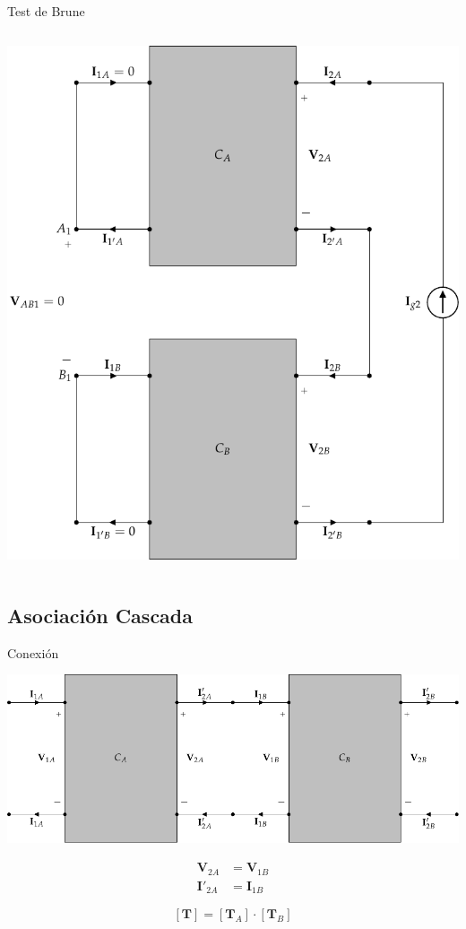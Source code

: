 \documentclass[aspectratio=169, usenames,svgnames,dvipsnames]{beamer}
\begin{document}
\begin{frame}[label={sec:org58fb5cc},plain]{Test de Brune}
\begin{columns}
\begin{column}{0.5\columnwidth}
\begin{center}
\includegraphics[height=0.8\textheight]{../figs/paralelo-serie-brune-salida.pdf}
\end{center}
\end{column}
\end{columns}
\end{frame}
\subsection{Asociación Cascada}
\label{sec:org3f9836b}

\begin{frame}[label={sec:org74dabef}]{Conexión}
\begin{center}
\includegraphics[height=0.5\textheight]{../figs/cascada.pdf}
\end{center}

\begin{align*}
  \mathbf{V}_{2A} &= \mathbf{V}_{1B}\\
  \mathbf{I}'_{2A} &= \mathbf{I}_{1B}
\end{align*}


\[
  \boxed{[\mathbf{T}] = [\mathbf{T}_A] \cdot [\mathbf{T}_B]}
\]
\end{frame}
\end{document}
